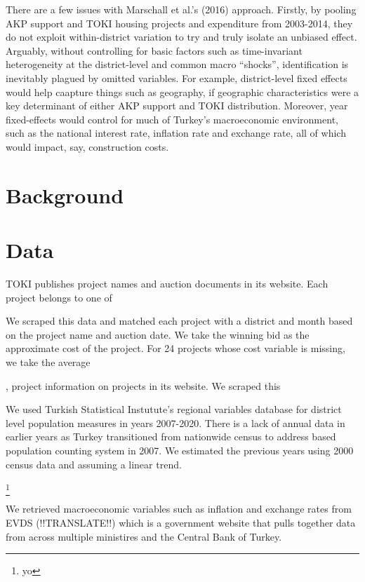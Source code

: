 \documentclass[10pt, oneside]{article}   	%
\numberwithin{equation}{section}
\begin{document}
There are a few issues with Marschall et al.'s (2016) approach. Firstly, by pooling AKP support and TOKI housing projects and expenditure from 2003-2014, they do not exploit within-district variation to try and truly isolate an unbiased effect. Arguably, without controlling for basic factors such as time-invariant heterogeneity at the district-level and common macro ``shocks'', identification is inevitably plagued by omitted variables. For example, district-level fixed effects would help caapture things such as geography, if geographic characteristics were a key determinant of either AKP support and TOKI distribution. Moreover, year fixed-effects would control for much of Turkey's macroeconomic environment, such as the national interest rate, inflation rate and exchange rate, all of which would impact, say, construction costs. 

\section{Background}



\section{Data}

TOKI publishes project names and auction documents in its website. Each project belongs to one of 


We scraped this data and matched each project with a district and month based on the project name and auction date. We take the winning bid as the approximate cost of the project. For 24 projects whose cost variable is missing, we take the average

, project  information on projects in its website. We scraped this 

We used Turkish Statistical Instutute's regional variables database for district level population measures in years 2007-2020. There is a lack of annual data in earlier years as Turkey transitioned from nationwide census to address based population counting system in 2007. We estimated the previous years using 2000 census data and assuming a linear trend. 

\footnote{yo}

We retrieved macroeconomic variables such as inflation and exchange rates from EVDS (!!TRANSLATE!!) which is a government website that pulls together data from across multiple ministires and the Central Bank of Turkey.
\end{document}
